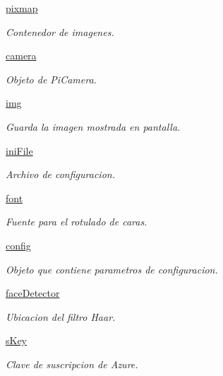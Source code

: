 \begin{DoxyCompactItemize}
\mbox{\hyperlink{classfacepi_1_1_face_pi_a265ba93b91b05aff63e24ffedbd8b488}{pixmap}}
\begin{DoxyCompactList}\small\item\em Contenedor de imagenes. \end{DoxyCompactList}\item 
\mbox{\hyperlink{classfacepi_1_1_face_pi_af8d79e94815c80b1ea8b98df8b5565f1}{camera}}
\begin{DoxyCompactList}\small\item\em Objeto de Pi\+Camera. \end{DoxyCompactList}\item 
\mbox{\hyperlink{classfacepi_1_1_face_pi_a4b3ecd462abe4ba265271f50c69a765a}{img}}
\begin{DoxyCompactList}\small\item\em Guarda la imagen mostrada en pantalla. \end{DoxyCompactList}\item 
\mbox{\hyperlink{classfacepi_1_1_face_pi_a49127c31ef994508911027e13dada2ad}{ini\+File}}
\begin{DoxyCompactList}\small\item\em Archivo de configuracion. \end{DoxyCompactList}\item 
\mbox{\hyperlink{classfacepi_1_1_face_pi_a160c61487b4522e4915a76fddc307248}{font}}
\begin{DoxyCompactList}\small\item\em Fuente para el rotulado de caras. \end{DoxyCompactList}\item 
\mbox{\hyperlink{classfacepi_1_1_face_pi_a0d82f2516e0c5daae93625f34a05eab6}{config}}
\begin{DoxyCompactList}\small\item\em Objeto que contiene parametros de configuracion. \end{DoxyCompactList}\item 
\mbox{\hyperlink{classfacepi_1_1_face_pi_aec6ab9276df6b39fdcf1ac346c28877e}{face\+Detector}}
\begin{DoxyCompactList}\small\item\em Ubicacion del filtro Haar. \end{DoxyCompactList}\item 
\mbox{\hyperlink{classfacepi_1_1_face_pi_a18d1b929c5d12dbea45397938fb65e31}{s\+Key}}
\begin{DoxyCompactList}\small\item\em Clave de suscripcion de Azure. \end{DoxyCompactList}\item 

\end{DoxyCompactItemize}
